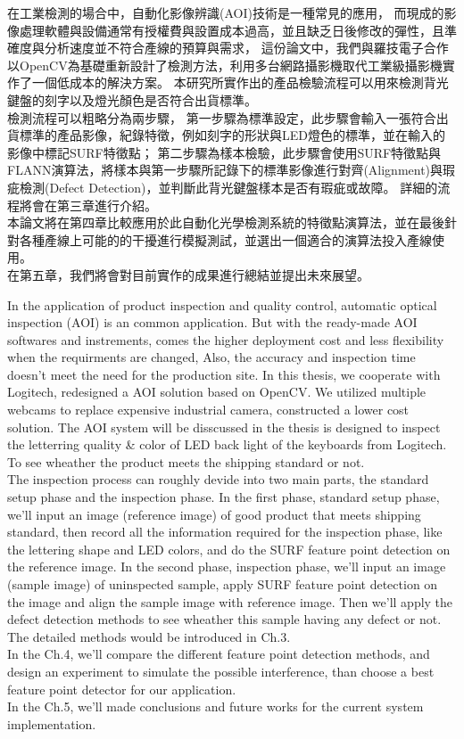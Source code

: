 \begin{abstractzh}
在工業檢測的場合中，自動化影像辨識(AOI)技術是一種常見的應用，
而現成的影像處理軟體與設備通常有授權費與設置成本過高，並且缺乏日後修改的彈性，且準確度與分析速度並不符合產線的預算與需求，
這份論文中，我們與羅技電子合作以OpenCV為基礎重新設計了檢測方法，利用多台網路攝影機取代工業級攝影機實作了一個低成本的解決方案。
本研究所實作出的產品檢驗流程可以用來檢測背光鍵盤的刻字以及燈光顏色是否符合出貨標準。\\
檢測流程可以粗略分為兩步驟，
第一步驟為標準設定，此步驟會輸入一張符合出貨標準的產品影像，紀錄特徵，例如刻字的形狀與LED燈色的標準，並在輸入的影像中標記SURF特徵點；
第二步驟為樣本檢驗，此步驟會使用SURF特徵點與FLANN演算法，將樣本與第一步驟所記錄下的標準影像進行對齊(Alignment)與瑕疵檢測(Defect Detection)，並判斷此背光鍵盤樣本是否有瑕疵或故障。
詳細的流程將會在第三章進行介紹。\\
本論文將在第四章比較應用於此自動化光學檢測系統的特徵點演算法，並在最後針對各種產線上可能的的干擾進行模擬測試，並選出一個適合的演算法投入產線使用。\\
在第五章，我們將會對目前實作的成果進行總結並提出未來展望。

\end{abstractzh}

\begin{abstracten}
In the application of product inspection and quality control, automatic optical inspection (AOI) is an common application.
But with the ready-made AOI softwares and instrements, comes the higher deployment cost and less flexibility when the requirments are changed, Also, the accuracy and inspection time doesn't meet the need for the production site.
In this thesis, we cooperate with Logitech, redesigned a AOI solution based on OpenCV.
We utilized multiple webcams to replace expensive industrial camera, constructed a lower cost solution.
The AOI system will be disscussed in the thesis is designed to inspect the letterring quality \& color of LED back light of the keyboards from Logitech. To see wheather the product meets the shipping standard or not.\\
The inspection process can roughly devide into two main parts, the standard setup phase and the inspection phase.
In the first phase, standard setup phase, we'll input an image (reference image) of good product that meets shipping standard, then record all the information required for the inspection phase, like the lettering shape and LED colors, and do the SURF feature point detection on the reference image.
In the second phase, inspection phase, we'll input an image (sample image) of uninspected sample, apply SURF feature point detection on the image and align the sample image with reference image. Then we'll apply the defect detection methods to see wheather this sample having any defect or not.
The detailed methods would be introduced in Ch.3.\\
In the Ch.4, we'll compare the different feature point detection methods, and design an experiment to simulate the possible interference, than choose a best feature point detector for our application.\\
In the Ch.5, we'll made conclusions and future works for the current system implementation. 

\end{abstracten}